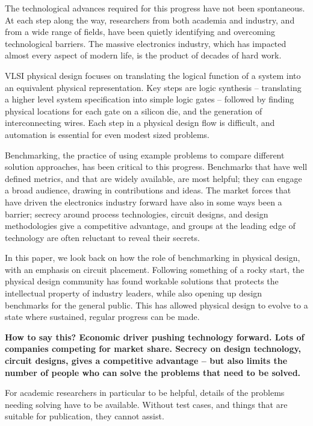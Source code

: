 \documentclass[sigconf]{acmart}
\begin{document}
The technological advances required for this progress
have not been spontaneous.  At each
step along the way, researchers from both academia and
industry, and from a wide range of fields,
have been quietly identifying and overcoming
technological barriers.  The massive electronics industry,
which has impacted almost every aspect of modern life,
is the product of decades of hard work.

VLSI physical design focuses on translating the logical function
of a system into an equivalent physical representation.  Key
steps are logic synthesis -- translating a higher level system
specification into simple logic gates -- followed by finding
physical locations for each gate on a silicon die, and the
generation of interconnecting wires.  Each step in a physical
design flow is difficult, and automation is essential for
even modest sized problems.

Benchmarking, the practice of using example problems to compare
different solution approaches, has been critical to this progress.
Benchmarks that have well defined metrics, and that are widely
available, are most helpful; they can engage a broad audience, drawing
in contributions and ideas.  The market forces that have driven the
electronics industry forward have also in some ways been a barrier;
secrecy
around process technologies, circuit designs, and design methodologies
give a competitive advantage, and groups at the leading edge of
technology are often reluctant to reveal their secrets.

In this paper, we look back on how the role of benchmarking
in physical design, with an emphasis on circuit placement.
Following something of a rocky start, the physical design
community has found workable solutions that protects the
intellectual property of industry leaders, while also
opening up design benchmarks for the general public.
This has allowed
physical design to evolve to a state where sustained,
regular progress can be made.


\iffalse
{\bf How to say this?
  Economic driver pushing technology forward.  Lots of
  companies competing for market share.  Secrecy on
  design technology, circuit designs, gives a competitive
  advantage -- but also limits the number of people who
  can solve the problems that need to be solved.

  For academic researchers in particular to be helpful,
  details of the problems needing solving have to be
  available.  Without test cases, and things that are
  suitable for publication, they cannot assist.
}
\end{document}
